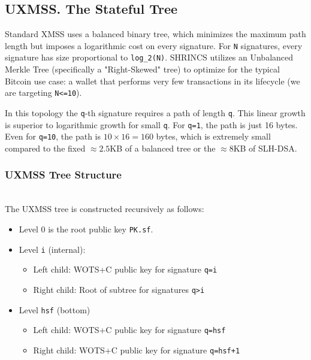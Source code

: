 \subsection{UXMSS. The Stateful Tree}
Standard XMSS uses a balanced binary tree, which minimizes the maximum path length but imposes a logarithmic cost on every signature. For \texttt{N} signatures, every signature has size proportional to \texttt{log\_2(N)}. SHRINCS utilizes an Unbalanced Merkle Tree (specifically a "Right-Skewed" tree) to optimize for the typical Bitcoin use case: a wallet that performs very few transactions in its lifecycle (we are targeting \texttt{N<=10}).

In this topology the \texttt{q}-th signature requires a path of length \texttt{q}. This linear growth is superior to logarithmic growth for small \texttt{q}. For \texttt{q=1}, the path is just 16 bytes. Even for \texttt{q=10}, the path is $10 \times 16 = 160$ bytes, which is extremely small compared to the fixed $\approx 2.5$KB of a balanced tree or the $\approx 8$KB of SLH-DSA.

\subsubsection{UXMSS Tree Structure}
 \\
The UXMSS tree is constructed recursively as follows:
\begin{itemize}
    \item Level 0 is the root public key \texttt{PK.sf}.
    \item Level \texttt{i} (internal):
    \begin{itemize}
        \item  Left child: WOTS+C public key for signature \texttt{q=i}
        \item  Right child: Root of subtree for signatures \texttt{q>i}
    \end{itemize}
    \item Level \texttt{hsf} (bottom)
    \begin{itemize}
        \item Left child: WOTS+C public key for signature \texttt{q=hsf}
        \item Right child: WOTS+C public key for signature \texttt{q=hsf+1}
    \end{itemize}
\end{itemize}


